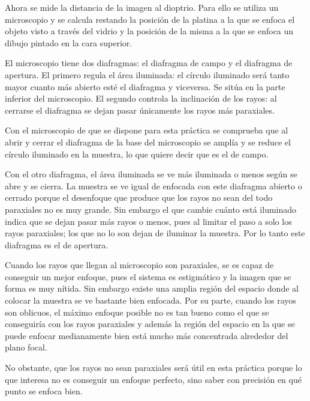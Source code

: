 \documentclass[12pt]{article}
\numberwithin{table}{section}
\numberwithin{figure}{section}
\numberwithin{equation}{section}
\begin{document}
Ahora se mide la distancia de la imagen al dioptrio. Para ello se utiliza un microscopio y se calcula restando la posición de la platina a la que se enfoca el objeto visto a través del vidrio y la posición de la misma a la que se enfoca un dibujo pintado en la cara superior.

El microscopio tiene dos diafragmas: el diafragma de campo y el diafragma de apertura. El primero regula el área iluminada: el círculo iluminado será tanto mayor cuanto más abierto esté el diafragma y viceversa. Se sitúa en la parte inferior del microscopio. El segundo controla la inclinación de los rayos: al cerrarse el diafragma se dejan pasar únicamente los rayos más paraxiales.

Con el microscopio de que se dispone para esta práctica se comprueba que al abrir y cerrar el diafragma de la base del microscopio se amplía y se reduce el círculo iluminado en la muestra, lo que quiere decir que es el de campo.

Con el otro diafragma, el área iluminada se ve más iluminada o menos según se abre y se cierra. La muestra se ve igual de enfocada con este diafragma abierto o cerrado porque el desenfoque que produce que los rayos no sean del todo paraxiales no es muy grande. Sin embargo el que cambie cuánto está iluminado indica que se dejan pasar más rayos o menos, pues al limitar el paso a solo los rayos paraxiales; los que no lo son dejan de iluminar la muestra. Por lo tanto este diafragma es el de apertura.

Cuando los rayos que llegan al microscopio son paraxiales, se es capaz de conseguir un mejor enfoque, pues el sistema es estigmático y la imagen que se forma es muy nítida. Sin embargo existe una amplia región del espacio donde al colocar la muestra se ve bastante bien enfocada. Por su parte, cuando los rayos son oblicuos, el máximo enfoque posible no es tan bueno como el que se conseguiría con los rayos paraxiales y además la región del espacio en la que se puede enfocar medianamente bien está mucho más concentrada alrededor del plano focal.

No obstante, que los rayos no sean paraxiales será útil en esta práctica porque lo que interesa no es conseguir un enfoque perfecto, sino saber con precisión en qué punto se enfoca bien.
\end{document}
